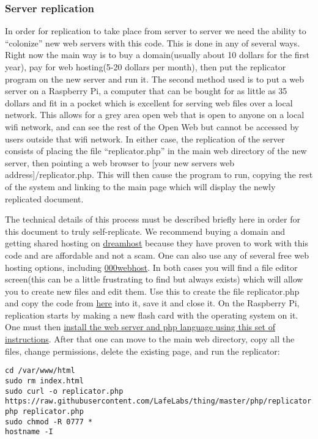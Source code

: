 \subsubsection{Server replication}\label{server-replication}

In order for replication to take place from server to server we need the
ability to ``colonize'' new web servers with this code. This is done in
any of several ways. Right now the main way is to buy a domain(usually
about 10 dollars for the first year), pay for web hosting(5-20 dollars
per month), then put the replicator program on the new server and run
it. The second method used is to put a web server on a Raspberry Pi, a
computer that can be bought for as little as 35 dollars and fit in a
pocket which is excellent for serving web files over a local network.
This allows for a grey area open web that is open to anyone on a local
wifi network, and can see the rest of the Open Web but cannot be
accessed by users outside that wifi network. In either case, the
replication of the server consists of placing the file
``replicator.php'' in the main web directory of the new server, then
pointing a web browser to {[}your new servers web
address{]}/replicator.php. This will then cause the program to run,
copying the rest of the system and linking to the main page which will
display the newly replicated document.

The technical details of this process must be described briefly here in
order for this document to truly self-replicate. We recommend buying a
domain and getting shared hosting on
\href{https://www.dreamhost.com/}{dreamhost} because they have proven to
work with this code and are affordable and not a scam. One can also use
any of several free web hosting options, including
\href{https://www.000webhost.com/}{000webhost}. In both cases you will
find a file editor screen(this can be a little frustrating to find but
always exists) which will allow you to create new files and edit them.
Use this to create the file replicator.php and copy the code from
\href{php/replicator.txt}{here} into it, save it and close it. On the
Raspberry Pi, replication starts by making a new flash card with the
operating system on it. One must then
\href{https://www.raspberrypi.org/documentation/remote-access/web-server/apache.md}{install
the web server and php language using this set of instructions}. After
that one can move to the main web directory, copy all the files, change
permissions, delete the existing page, and run the replicator:

\begin{verbatim}
cd /var/www/html
sudo rm index.html
sudo curl -o replicator.php https://raw.githubusercontent.com/LafeLabs/thing/master/php/replicator.txt
php replicator.php
sudo chmod -R 0777 *
hostname -I
\end{verbatim}

